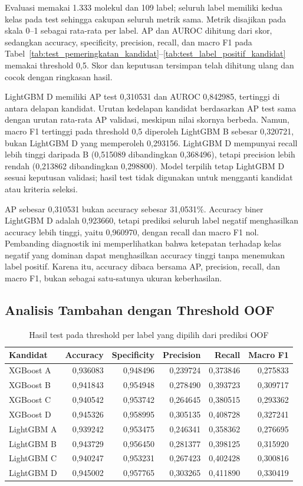 Evaluasi memakai 1.333 molekul dan 109 label; seluruh label memiliki kedua kelas pada test sehingga cakupan seluruh metrik sama. Metrik disajikan pada skala 0--1 sebagai rata-rata per label. AP dan AUROC dihitung dari skor, sedangkan accuracy, specificity, precision, recall, dan macro F1 pada Tabel~\ref{tab:test_pemeringkatan_kandidat}--\ref{tab:test_label_positif_kandidat} memakai threshold 0,5. Skor dan keputusan tersimpan telah dihitung ulang dan cocok dengan ringkasan hasil.

LightGBM D memiliki AP test 0,310531 dan AUROC 0,842985, tertinggi di antara delapan kandidat. Urutan kedelapan kandidat berdasarkan AP test sama dengan urutan rata-rata AP validasi, meskipun nilai skornya berbeda. Namun, macro F1 tertinggi pada threshold 0,5 diperoleh LightGBM B sebesar 0,320721, bukan LightGBM D yang memperoleh 0,293156. LightGBM D mempunyai recall lebih tinggi daripada B (0,515089 dibandingkan 0,368496), tetapi precision lebih rendah (0,213862 dibandingkan 0,298800). Model terpilih tetap LightGBM D sesuai keputusan validasi; hasil test tidak digunakan untuk mengganti kandidat atau kriteria seleksi.

AP sebesar 0,310531 bukan accuracy sebesar 31,0531\%. Accuracy biner LightGBM D adalah 0,923660, tetapi prediksi seluruh label negatif menghasilkan accuracy lebih tinggi, yaitu 0,960970, dengan recall dan macro F1 nol. Pembanding diagnostik ini memperlihatkan bahwa ketepatan terhadap kelas negatif yang dominan dapat menghasilkan accuracy tinggi tanpa menemukan label positif. Karena itu, accuracy dibaca bersama AP, precision, recall, dan macro F1, bukan sebagai satu-satunya ukuran keberhasilan.

\subsection{Analisis Tambahan dengan Threshold OOF}
\begin{table}[htbp]
\centering
\caption{Hasil test pada threshold per label yang dipilih dari prediksi OOF}
\label{tab:test_ambang_oof}
\small
\setlength{\tabcolsep}{4pt}
\begin{tabular}{lrrrrr}
\toprule
Kandidat & Accuracy & Specificity & Precision & Recall & Macro F1 \\
\midrule
XGBoost A & 0,936083 & 0,948496 & 0,239724 & 0,373846 & 0,275833 \\
XGBoost B & 0,941843 & 0,954948 & 0,278490 & 0,393723 & 0,309717 \\
XGBoost C & 0,940542 & 0,953742 & 0,264645 & 0,380515 & 0,293362 \\
XGBoost D & 0,945326 & 0,958995 & 0,305135 & 0,408728 & 0,327241 \\
LightGBM A & 0,939242 & 0,953475 & 0,246341 & 0,358362 & 0,276695 \\
LightGBM B & 0,943729 & 0,956450 & 0,281377 & 0,398125 & 0,315920 \\
LightGBM C & 0,940247 & 0,953231 & 0,267423 & 0,402428 & 0,300816 \\
LightGBM D & 0,945002 & 0,957765 & 0,303265 & 0,411890 & 0,330419 \\
\bottomrule
\end{tabular}
\end{table}

